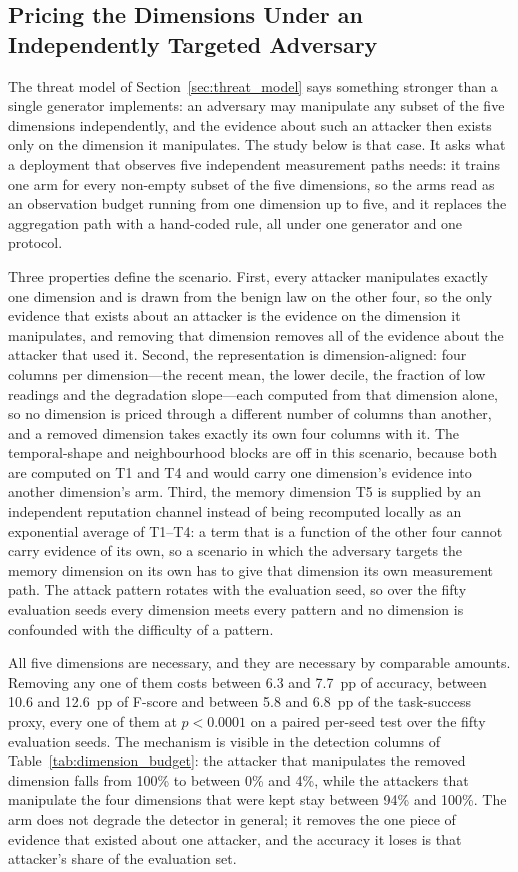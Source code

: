 \documentclass[notspecified,article,submit,moreauthors]{Definitions/mdpi}
\begin{document}
\subsection{Pricing the Dimensions Under an Independently Targeted Adversary}
\label{sec:factor_dependence_channels}
The threat model of Section~\ref{sec:threat_model} says something stronger than a single generator implements: an adversary may manipulate any subset of the five dimensions independently, and the evidence about such an attacker then exists only on the dimension it manipulates. The study below is that case. It asks what a deployment that observes five independent measurement paths needs: it trains one arm for every non-empty subset of the five dimensions, so the arms read as an observation budget running from one dimension up to five, and it replaces the aggregation path with a hand-coded rule, all under one generator and one protocol.

Three properties define the scenario. First, every attacker manipulates exactly one dimension and is drawn from the benign law on the other four, so the only evidence that exists about an attacker is the evidence on the dimension it manipulates, and removing that dimension removes all of the evidence about the attacker that used it. Second, the representation is dimension-aligned: four columns per dimension---the recent mean, the lower decile, the fraction of low readings and the degradation slope---each computed from that dimension alone, so no dimension is priced through a different number of columns than another, and a removed dimension takes exactly its own four columns with it. The temporal-shape and neighbourhood blocks are off in this scenario, because both are computed on T1 and T4 and would carry one dimension's evidence into another dimension's arm. Third, the memory dimension T5 is supplied by an independent reputation channel instead of being recomputed locally as an exponential average of T1--T4: a term that is a function of the other four cannot carry evidence of its own, so a scenario in which the adversary targets the memory dimension on its own has to give that dimension its own measurement path. The attack pattern rotates with the evaluation seed, so over the fifty evaluation seeds every dimension meets every pattern and no dimension is confounded with the difficulty of a pattern.


All five dimensions are necessary, and they are necessary by comparable amounts. Removing any one of them costs between 6.3 and 7.7~pp of accuracy, between 10.6 and 12.6~pp of F-score and between 5.8 and 6.8~pp of the task-success proxy, every one of them at $p<0.0001$ on a paired per-seed test over the fifty evaluation seeds. The mechanism is visible in the detection columns of Table~\ref{tab:dimension_budget}: the attacker that manipulates the removed dimension falls from 100\% to between 0\% and 4\%, while the attackers that manipulate the four dimensions that were kept stay between 94\% and 100\%. The arm does not degrade the detector in general; it removes the one piece of evidence that existed about one attacker, and the accuracy it loses is that attacker's share of the evaluation set.
\end{document}
